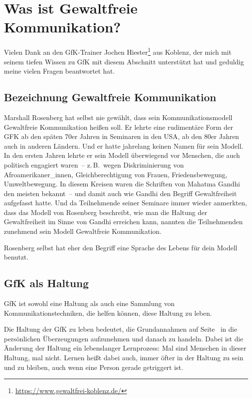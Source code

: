 \section{Was ist Gewaltfreie Kommunikation?}

Vielen Dank an den GfK-Trainer Jochen Hiester\footnote{\url{https://www.gewaltfrei-koblenz.de/}} aus Koblenz, der mich mit seinem tiefen Wissen zu GfK mit diesem Abschnitt unterstützt hat und geduldig meine vielen Fragen beantwortet hat.


\subsection{Bezeichnung \glqq Gewaltfreie Kommunikation\grqq}

Marshall Rosenberg hat selbst nie gewählt, dass sein Kommunikationsmodell Gewaltfreie Kommunikation heißen soll. Er lehrte eine rudimentäre Form der GFK ab den späten 70er Jahren in Seminaren in den USA, ab den 80er Jahren auch in anderen Ländern. Und er hatte jahrelang keinen Namen für sein Modell. In den ersten Jahren lehrte er sein Modell überwiegend vor Menschen, die auch politisch engagiert waren~-- z.\,B.~wegen Diskriminierung von Afroamerikaner\_innen, Gleichberechtigung von Frauen, Friedensbewegung, Umweltbewegung. In diesem Kreisen waren die Schriften von Mahatma Gandhi den meisten bekannt~-- und damit auch wie Gandhi den Begriff \glqq Gewaltfreiheit\grqq{} aufgefasst hatte. Und da Teilnehmende seiner Seminare immer wieder anmerkten, dass das Modell von Rosenberg beschreibt, wie man die Haltung der Gewaltfreiheit im Sinne von Gandhi erreichen kann, nannten die Teilnehmenden zunehmend sein Modell Gewaltfreie Kommunikation.

Rosenberg selbst hat eher den Begriff \glqq eine Sprache des Lebens\grqq{} für dein Modell benutzt.


\subsection{GfK als Haltung}
\label{gfk-haltung}

GfK ist sowohl eine Haltung als auch eine Sammlung von Kommunikationstechniken, die helfen können, diese Haltung zu leben.

Die Haltung der GfK zu leben bedeutet, die Grundannahmen auf Seite~\pageref{gfk-annahmen} in die persönlichen Überzeugungen aufzunehmen und danach zu handeln. Dabei ist die Änderung der Haltung ein lebenslanger Lernprozess: Mal sind Menschen in dieser Haltung, mal nicht. Lernen heißt dabei auch, immer öfter in der Haltung zu sein und zu bleiben, auch wenn eine Person gerade getriggert ist.


